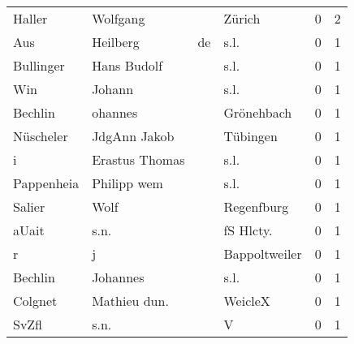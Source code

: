 \begin{tabular}{llllrr}
                   Haller &                           Wolfgang &             &                                      Zürich &          0 &         2 \\
                      Aus &                           Heilberg &          de &                                        s.l. &          0 &         1 \\
                Bullinger &                        Hans Budolf &             &                                        s.l. &          0 &         1 \\
                      Win &                             Johann &             &                                        s.l. &          0 &         1 \\
                  Bechlin &                            ohannes &             &                                  Grönehbach &          0 &         1 \\
                Nüscheler &                       JdgAnn Jakob &             &                                    Tübingen &          0 &         1 \\
                        i &                     Erastus Thomas &             &                                        s.l. &          0 &         1 \\
               Pappenheia &                        Philipp wem &             &                                        s.l. &          0 &         1 \\
                   Salier &                               Wolf &             &                                  Regenfburg &          0 &         1 \\
                    aUait &                               s.n. &             &                                  fS Hlcty.  &          0 &         1 \\
                        r &                                  j &             &                               Bappoltweiler &          0 &         1 \\
                  Bechlin &                           Johannes &             &                                        s.l. &          0 &         1 \\
                  Colgnet &                       Mathieu dun. &             &                                     WeicleX &          0 &         1 \\
                    SvZfl &                               s.n. &             &                                           V &          0 &         1 \\

\end{tabular}
